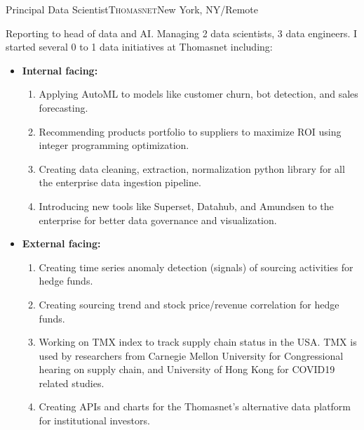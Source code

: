 \documentclass[12pt,a4paper,roman]{moderncv} %
\begin{document}
 {Principal Data Scientist}{\textsc{Thomasnet}}{New York, NY/Remote}{}{
Reporting to head of data and AI. Managing 2 data scientists, 3 data engineers.
I started several 0 to 1 data initiatives at Thomasnet including:
\begin{itemize}
\item \textbf{Internal facing:}
    \begin{enumerate}
    \item Applying AutoML to models like customer churn, bot detection, and sales forecasting.
    \item Recommending products portfolio to suppliers to maximize ROI using integer programming optimization.
    \item  Creating data cleaning, extraction, normalization python library for all the enterprise data ingestion pipeline.
    \item Introducing new tools like Superset, Datahub, and Amundsen to the enterprise for better data governance and visualization.
    \end{enumerate}
\item \textbf{External facing:}
    \begin{enumerate}
    \item Creating time series anomaly detection (signals) of sourcing activities for hedge funds.
    \item Creating sourcing trend and stock price/revenue correlation for hedge funds.
    \item Working on TMX index to track supply chain status in the USA. TMX is used by researchers from Carnegie Mellon University for Congressional hearing on supply chain, and University of Hong Kong for COVID19 related studies.
    \item Creating APIs and charts for the Thomasnet's alternative data platform for institutional investors.
    \end{enumerate}
\end{itemize}
 }
\end{document}
